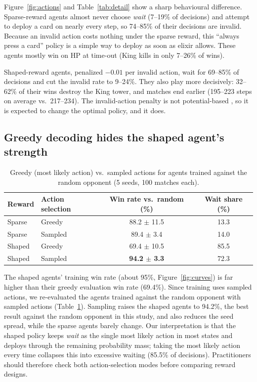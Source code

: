 \documentclass[11pt]{article}
\begin{document}
Figure~\ref{fig:actions} and Table~\ref{tab:detail} show a sharp behavioural
difference. Sparse-reward agents almost never choose \emph{wait} (7--19\% of
decisions) and attempt to deploy a card on nearly every step, so 74--85\% of
their decisions are invalid. Because an invalid action costs nothing under the
sparse reward, this ``always press a card'' policy is a simple way to deploy
as soon as elixir allows. These agents mostly win on HP at time-out (King kills
in only 7--26\% of wins).

Shaped-reward agents, penalized $-0.01$ per invalid action, wait for 69--85\%
of decisions and cut the invalid rate to 9--24\%. They also play more
decisively: 32--62\% of their wins destroy the King tower, and matches end
earlier (195--223 steps on average vs.\ 217--234). The invalid-action penalty
is not potential-based \citep{ng1999shaping}, so it is expected to change the
optimal policy, and it does.

\subsection{Greedy decoding hides the shaped agent's strength}
\label{sec:greedy}

\begin{table}[t]
\centering
\small
\begin{tabular}{llcc}
\toprule
Reward & Action selection & Win rate vs.\ random (\%) & Wait share (\%) \\
\midrule
Sparse & Greedy  & 88.2 $\pm$ 11.5 & 13.3 \\
Sparse & Sampled & 89.4 $\pm$ \phantom{0}3.4 & 14.0 \\
Shaped & Greedy  & 69.4 $\pm$ 10.5 & 85.5 \\
Shaped & Sampled & \textbf{94.2 $\pm$ \phantom{0}3.3} & 72.3 \\
\bottomrule
\end{tabular}
\caption{Greedy (most likely action) vs.\ sampled actions for agents trained
against the random opponent (5 seeds, 100 matches each).}
\label{tab:greedy}
\end{table}

The shaped agents' training win rate (about 95\%, Figure~\ref{fig:curves})
is far higher than their greedy evaluation win rate (69.4\%). Since training
uses sampled actions, we re-evaluated the agents trained against the random
opponent with sampled actions (Table~\ref{tab:greedy}). Sampling raises the
shaped agents to 94.2\%, the best result against the random opponent in this
study, and also reduces the seed spread, while the sparse agents barely
change. Our interpretation is that the shaped policy keeps \emph{wait} as the
single most likely action in most states and deploys through the remaining
probability mass; taking the most likely action every time collapses this
into excessive waiting (85.5\% of decisions). Practitioners should therefore
check both action-selection modes before comparing reward designs.
\end{document}
